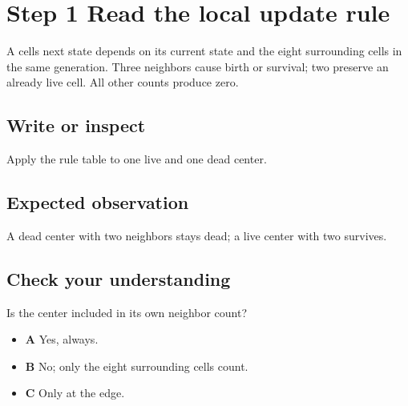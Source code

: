 \section{Step 1 Read the local update
  rule}\label{008-life-generations-s01-step-1-read-the-local-update-rule}

A cell\textquotesingle s next state depends on its current state and the
eight surrounding cells in the same generation. Three neighbors cause
birth or survival; two preserve an already live cell. All other counts
produce zero.

\subsection{Write or
  inspect}\label{008-life-generations-s01-write-or-inspect}

Apply the rule table to one live and one dead center.

\subsection{Expected
  observation}\label{008-life-generations-s01-expected-observation}

A dead center with two neighbors stays dead; a live center with two
survives.

\subsection{Check your
  understanding}\label{008-life-generations-s01-check-your-understanding}

Is the center included in its own neighbor count?

\begin{itemize}
  \tightlist
  \item
        \textbf{A} Yes, always.
  \item
        \textbf{B} No; only the eight surrounding cells count.
  \item
        \textbf{C} Only at the edge.
\end{itemize}

